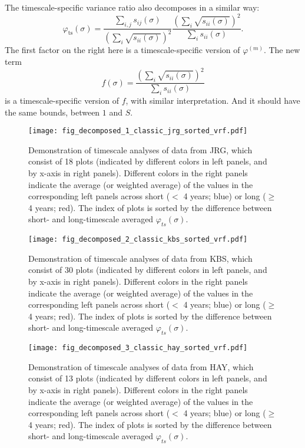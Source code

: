 \documentclass[letterpaper,11pt]{article}
\begin{document}
The timescale-specific variance ratio also decomposes in a similar way:
\begin{equation}
\varphi_{\text{ts}}(\sigma)=\frac{\sum_{i,j}s_{ij}(\sigma)}{(\sum_i \sqrt{s_{ii}(\sigma)})^2}
\frac{(\sum_i \sqrt{s_{ii}(\sigma)})^2}{\sum_i s_{ii}(\sigma)}.
\end{equation}
The first factor on the right here is a timescale-specific version of 
$\varphi^{(m)}$. The new term
\begin{equation}
f(\sigma)=\frac{(\sum_i \sqrt{s_{ii}(\sigma)})^2}{\sum_i s_{ii}(\sigma)}
\end{equation}
is a timescale-specific version of $f$, with similar interpretation.
And it should have the same bounds, between $1$ and $S$.


\begin{figure}
\texttt{[image: fig\_decomposed\_1\_classic\_jrg\_sorted\_vrf.pdf]}
\caption{Demonstration of timescale analyses of data from JRG, which consist of 18 plots (indicated by different colors in left panels, and by x-axis in right panels). Different colors in the right panels indicate the average (or weighted average) of the values in the corresponding left panels across short ($<$ 4 years; blue) or long ($\geq$ 4 years; red). The index of plots is sorted by the difference between short- and long-timescale averaged $\varphi _{ts} (\sigma)$.}
\end{figure}

\begin{figure}
\texttt{[image: fig\_decomposed\_2\_classic\_kbs\_sorted\_vrf.pdf]}
\caption{Demonstration of timescale analyses of data from KBS, which consist of 30 plots (indicated by different colors in left panels, and by x-axis in right panels). Different colors in the right panels indicate the average (or weighted average) of the values in the corresponding left panels across short ($<$ 4 years; blue) or long ($\geq$ 4 years; red). The index of plots is sorted by the difference between short- and long-timescale averaged $\varphi _{ts} (\sigma)$.}
\end{figure}

\begin{figure}
\texttt{[image: fig\_decomposed\_3\_classic\_hay\_sorted\_vrf.pdf]}
\caption{Demonstration of timescale analyses of data from HAY, which consist of 13 plots (indicated by different colors in left panels, and by x-axis in right panels). Different colors in the right panels indicate the average (or weighted average) of the values in the corresponding left panels across short ($<$ 4 years; blue) or long ($\geq$ 4 years; red). The index of plots is sorted by the difference between short- and long-timescale averaged $\varphi _{ts} (\sigma)$.}
\end{figure}
\end{document}
